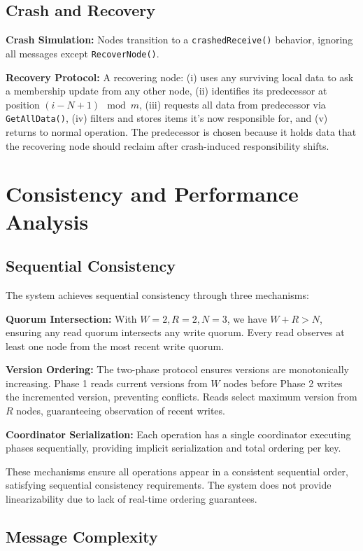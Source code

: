\documentclass{article}
\begin{document}
\subsection{Crash and Recovery}

\textbf{Crash Simulation:} Nodes transition to a \texttt{crashedReceive()} behavior, ignoring all messages except \texttt{RecoverNode()}.

\textbf{Recovery Protocol:} A recovering node: (i) uses any surviving local data to ask a membership update from any other node, (ii) identifies its predecessor at position $(i - N + 1) \mod m$, (iii) requests all data from predecessor via \texttt{GetAllData()}, (iv) filters and stores items it's now responsible for, and (v) returns to normal operation. The predecessor is chosen because it holds data that the recovering node should reclaim after crash-induced responsibility shifts.

\section{Consistency and Performance Analysis}

\subsection{Sequential Consistency}

The system achieves sequential consistency through three mechanisms:

\textbf{Quorum Intersection:} With $W=2, R=2, N=3$, we have $W + R > N$, ensuring any read quorum intersects any write quorum. Every read observes at least one node from the most recent write quorum.

\textbf{Version Ordering:} The two-phase protocol ensures versions are monotonically increasing. Phase 1 reads current versions from $W$ nodes before Phase 2 writes the incremented version, preventing conflicts. Reads select maximum version from $R$ nodes, guaranteeing observation of recent writes.

\textbf{Coordinator Serialization:} Each operation has a single coordinator executing phases sequentially, providing implicit serialization and total ordering per key.

These mechanisms ensure all operations appear in a consistent sequential order, satisfying sequential consistency requirements. The system does not provide linearizability due to lack of real-time ordering guarantees.

\subsection{Message Complexity}
\end{document}
